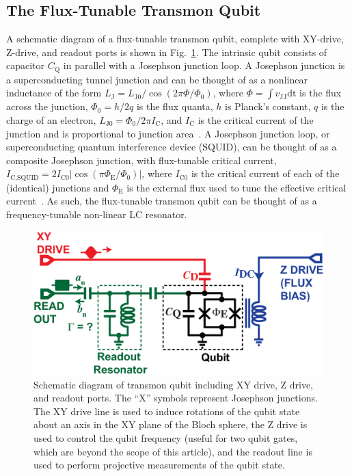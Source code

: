 \documentclass[journal]{IEEEtran}
\newcommand{\CR}[1]{{\color{black}#1}}
\begin{document}
\subsection{The Flux-Tunable Transmon Qubit}
A schematic diagram of a flux-tunable transmon qubit, complete with XY-drive, Z-drive, and readout ports is shown in Fig.~\ref{XMON}. The intrinsic qubit consists of capacitor $C_\text{Q}$ in parallel with a Josephson junction loop. A Josephson junction is a superconducting tunnel junction and can be thought of as a nonlinear inductance of the form $L_\text{J}=L_\text{J0}/\cos\left(2\pi\Phi/\Phi_\text{0}\right)$, where $\Phi=\int{}v_\text{JJ}\mathrm{dt}$ is the flux \CR{across} the junction, $\Phi_\text{0}=h/2q$ is the flux quanta, $h$ is Planck's constant, $q$ is the charge of an electron, $L_\text{J0}=\Phi_\text{0}/2\pi{}I_\text{C}$, and $I_\text{C}$ is the critical current of the junction and is proportional to junction area~\cite{kadin1999introduction}. A Josephson junction loop, or \CR{superconducting quantum interference device (SQUID)}, can be thought of as a composite Josephson junction, with flux-tunable critical current, $I_\text{C,SQUID}=2I_\text{C0}\left|\cos\left(\pi\Phi_\text{E}/\Phi_0\right)\right|$, where $I_\text{C0}$ is the critical current of each of the (identical) junctions and $\Phi_\text{E}$ is the external flux used to tune the effective critical current~\cite{tinkham2004introduction}. As such, the flux-tunable transmon qubit can be thought of as a frequency-tunable non-linear LC resonator. %
\begin{figure}[bt!]\begin{center}
\includegraphics[width=\columnwidth]{Figures/FIGURE_3}
\end{center}
\caption{Schematic diagram of transmon qubit including XY drive, Z drive, and readout ports. The ``X'' symbols represent Josephson junctions\CR{.} The XY drive line is used to induce rotations of the qubit state about an axis in the XY plane of the Bloch sphere, the Z drive is used to control the qubit frequency (useful for two qubit gates, which are beyond the scope of this article), and the readout line is used to perform projective measurements of the qubit state.}\label{XMON}
\end{figure}
\end{document}
